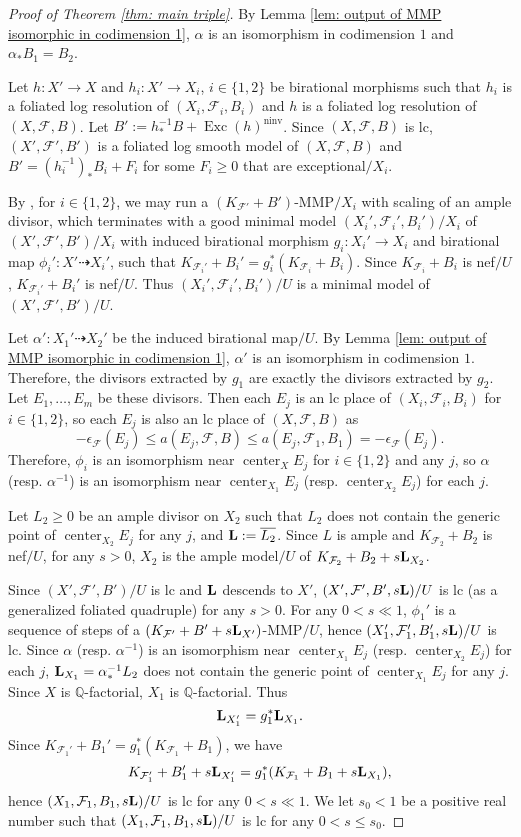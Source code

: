\documentclass[11pt]{amsart}
\numberwithin{equation}{section}
\newcommand{\Qq}{\mathbb{Q}}
\newcommand{\Center}{\operatorname{center}}
\newcommand{\Exc}{\operatorname{Exc}}
\newcommand{\ninv}{{\operatorname{ninv}}}
\newcommand{\Ff}{\mathcal{F}}
\newcommand{\Ll}{{\bf{L}}}
\theoremstyle{definition}
\theoremstyle{definition}
\theoremstyle{definition}
\begin{document}
\begin{proof}[Proof of Theorem \ref{thm: main triple}]
By Lemma \ref{lem: output of MMP isomorphic in codimension 1}, $\alpha$ is an isomorphism in codimension $1$ and $\alpha_*B_1=B_2$.

Let $h: X'\rightarrow X$ and $h_i: X'\rightarrow X_i$, $i\in\{1,2\}$ be birational morphisms such that $h_i$ is a foliated log resolution of $(X_i,\Ff_i,B_i)$ and $h$ is a foliated log resolution of $(X,\Ff,B)$. Let $B':=h^{-1}_*B+\Exc(h)^{\ninv}$. Since $(X,\Ff,B)$ is lc, $(X',\Ff',B')$ is a foliated log smooth model of $(X,\Ff,B)$ and $B'=(h_i^{-1})_*B_i+F_i$ for some $F_i\geq 0$ that are exceptional$/X_i$. 

By \cite[Lemma 4.13]{LMX24b}, for $i\in\{1,2\}$, we may run a $(K_{\Ff'}+B')$-MMP$/X_i$ with scaling of an ample divisor, which terminates with a good minimal model $(X_i',\Ff_i',B_i')/X_i$ of $(X',\Ff',B')/X_i$ with induced birational morphism $g_i: X_i'\rightarrow X_i$ and birational map $\phi_i': X'\dashrightarrow X_i'$, such that $K_{\Ff_i'}+B_i'=g_i^*(K_{\Ff_i}+B_i)$. Since $K_{\Ff_i}+B_i$ is nef$/U$, $K_{\Ff_i'}+B_i'$ is nef$/U$. Thus $(X_i',\Ff_i',B_i')/U$ is a minimal model of $(X',\Ff',B')/U$. 

Let $\alpha': X_1'\dashrightarrow X_2'$ be the induced birational map$/U$. By Lemma \ref{lem: output of MMP isomorphic in codimension 1}, $\alpha'$ is an isomorphism in codimension $1$. Therefore, the divisors extracted by $g_1$ are exactly the divisors extracted by $g_2$. Let $E_1,\dots,E_m$ be these divisors. Then each $E_j$ is an lc place of $(X_i,\Ff_i,B_i)$ for $i\in\{1,2\}$, so each $E_j$ is also an lc place of $(X,\Ff,B)$ as
$$-\epsilon_{\Ff}(E_j)\leq a(E_j,\Ff,B)\leq a(E_j,\Ff_1,B_1)=-\epsilon_{\Ff}(E_j).$$
Therefore, $\phi_i$ is an isomorphism near $\Center_XE_j$ for $i\in\{1,2\}$ and any $j$, so $\alpha$ (resp. $\alpha^{-1}$) is an isomorphism near $\Center_{X_1}E_j$ (resp. $\Center_{X_2}E_j$) for each $j$.

Let $L_2\geq 0$ be an ample divisor on $X_2$ such that $L_2$ does not contain the generic point of $\Center_{X_2}E_j$ for any $j$, and $\Ll:=\overline{L_2}$. Since $L$ is ample and $K_{\Ff_2}+B_2$ is nef$/U$, for any $s>0$, $X_2$ is the ample model$/U$ of $K_{\Ff_2}+B_2+s\Ll_{X_2}$. 

Since $(X',\Ff',B')/U$ is lc and $\Ll$ descends to $X'$, $(X',\Ff',B',s\Ll)/U$ is lc (as a generalized foliated quadruple) for any $s>0$. For any $0<s\ll 1$, $\phi_1'$ is a sequence of steps of a $(K_{\Ff'}+B'+s\Ll_{X'})$-MMP$/U$, hence $(X_1',\Ff_1',B_1',s\Ll)/U$ is lc. Since $\alpha$ (resp. $\alpha^{-1}$) is an isomorphism near $\Center_{X_1}E_j$ (resp. $\Center_{X_2}E_j$) for each $j$, $\Ll_{X_1}=\alpha^{-1}_{\ast}L_2$ does not contain the generic point of $\Center_{X_1}E_j$ for any $j$. Since $X$ is $\Qq$-factorial, $X_1$ is $\Qq$-factorial. Thus
$$\Ll_{X_1'}=g_1^*\Ll_{X_1}.$$
Since $K_{\Ff_1'}+B_1'=g_1^*(K_{\Ff_1}+B_1)$, we have
$$K_{\Ff_1'}+B_1'+s\Ll_{X_1'}=g_1^*(K_{\Ff_1}+B_1+s\Ll_{X_1}),$$
hence $(X_1,\Ff_1,B_1,s\Ll)/U$ is lc for any $0<s\ll 1$. We let $s_0<1$ be a positive real number such that  $(X_1,\Ff_1,B_1,s\Ll)/U$ is lc for any $0<s\leq s_0$.


\end{proof}
\end{document}
